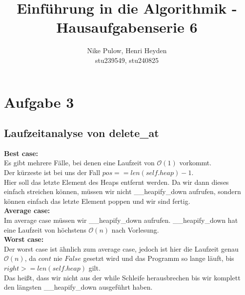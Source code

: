 \documentclass[12pt, a4paper]{article}
\title{Einführung in die Algorithmik - Hausaufgabenserie 6}
\author{Nike Pulow, Henri Heyden\\ \small stu239549, stu240825}
\date{}
\begin{document}
\maketitle
\section*{Aufgabe 3}
\subsection*{Laufzeitanalyse von delete\_at}
\textbf{Best case:}\\
Es gibt mehrere Fälle, bei denen eine Laufzeit von \(\mathcal O(1)\) vorkommt. \\
Der kürzeste ist bei uns der Fall \(pos == len(self.heap) - 1\). \\
Hier soll das letzte Element des Heaps entfernt werden. Da wir dann dieses einfach streichen können, müssen wir nicht \_\_heapify\_down aufrufen, sondern können einfach das letzte Element poppen und wir sind fertig. \\
\textbf{Average case:}\\
Im average case müssen wir \_\_heapify\_down aufrufen. \_\_heapify\_down hat eine Laufzeit von höchstens \(\mathcal O(n)\) nach Vorlesung.\\
\textbf{Worst case:}\\
Der worst case ist ähnlich zum average case, jedoch ist hier die Laufzeit genau \(\mathcal O(n)\), da \(cont\) nie \(False\) gesetzt wird und das Programm so lange läuft, bis \(right >= len(self.heap)\) gilt.\\
Das heißt, dass wir nicht aus der while Schleife herausbrechen bis wir komplett den längsten \_\_heapify\_down ausgeführt haben.
\end{document}
